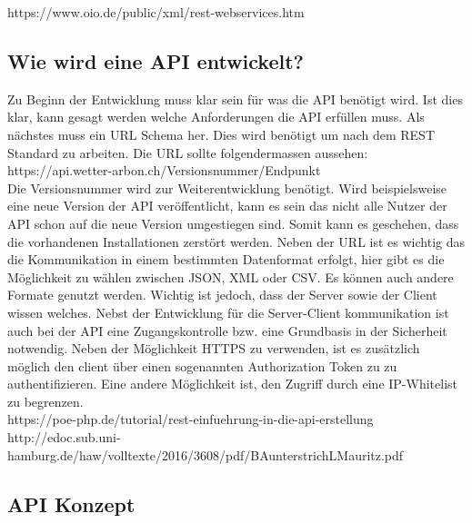 https://www.oio.de/public/xml/rest-webservices.htm

\subsection{Wie wird eine API entwickelt?}
Zu Beginn der Entwicklung muss klar sein für was die API benötigt wird. Ist dies klar, kann gesagt werden welche Anforderungen die API erfüllen muss. Als nächstes muss ein URL Schema her. Dies wird benötigt um nach dem REST Standard zu arbeiten. Die URL sollte folgendermassen aussehen: \\ https://api.wetter-arbon.ch/Versionsnummer/Endpunkt\\
Die Versionsnummer wird zur Weiterentwicklung benötigt. Wird beispielsweise eine neue Version der API veröffentlicht, kann es sein das nicht alle Nutzer der API schon auf die neue Version umgestiegen sind. Somit kann es geschehen, dass die vorhandenen Installationen zerstört werden. Neben der URL ist es wichtig das die Kommunikation in einem bestimmten Datenformat erfolgt, hier gibt es die Möglichkeit zu wählen zwischen JSON, XML oder CSV. Es können auch andere Formate genutzt werden. Wichtig ist jedoch, dass der Server sowie der Client wissen welches. Nebst der Entwicklung für die Server-Client kommunikation ist auch bei der API eine Zugangskontrolle bzw. eine Grundbasis in der Sicherheit notwendig. Neben der Möglichkeit HTTPS zu verwenden, ist es zusätzlich möglich den client über einen sogenannten Authorization Token zu zu authentifizieren. Eine andere Möglichkeit ist, den Zugriff durch eine IP-Whitelist zu begrenzen. \\

https://poe-php.de/tutorial/rest-einfuehrung-in-die-api-erstellung\\
http://edoc.sub.uni-hamburg.de/haw/volltexte/2016/3608/pdf/BAunterstrichLMauritz.pdf\\

\subsection{API Konzept}

